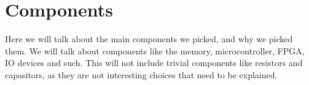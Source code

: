 \section {Components}

Here we will talk about the main components we picked, and why we picked them.
We will talk about components like the memory, microcontroller, FPGA, IO devices and such.
This will not include trivial components like resistors and capasitors, as they are not interesting choices that need to be explained.
